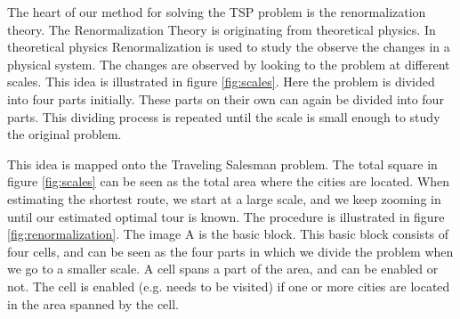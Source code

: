 The heart of our method for solving the TSP problem is the renormalization theory. The Renormalization Theory is originating from theoretical physics. In theoretical physics Renormalization is used to study the observe the changes in a physical system. The changes are observed by looking to the problem at different scales. This idea is illustrated in figure \ref{fig:scales}. Here the problem is divided into four parts initially. These parts on their own can again be divided into four parts. This dividing process is repeated until the scale is small enough to study the original problem.

This idea is mapped onto the Traveling Salesman problem. The total square in figure \ref{fig:scales} can be seen as the total area where the cities are located. When estimating the shortest route, we start at a large scale, and we keep zooming in until our estimated optimal tour is known. The procedure is illustrated in figure \ref{fig:renormalization}. The image A is the basic block. This basic block consists of four cells, and can be seen as the four parts in which we divide the problem when we go to a smaller scale. A cell spans a part of the area, and can be enabled or not. The cell is enabled (e.g. needs to be visited) if one or more cities are located in the area spanned by the cell.

